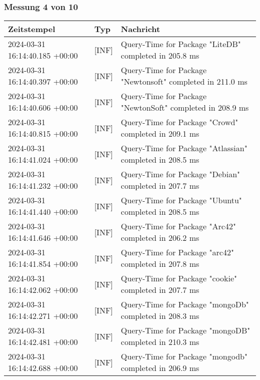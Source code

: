     \subsubsection*{Messung 4 von 10} \label{subsubsec:MySQLOhneIndex4von10}
        {
            {\small
                \begin{tabularx}{\textwidth}{|l|l|X|}
                    \hline
                    \textbf{Zeitstempel} & \textbf{Typ} & \textbf{Nachricht} \\
                    \hline
                    \endhead
                    2024-03-31 16:14:40.185 +00:00 & [INF] & Query-Time for Package "LiteDB" completed in 205.8 ms \\
                    2024-03-31 16:14:40.397 +00:00 & [INF] & Query-Time for Package "Newtonsoft" completed in 211.0 ms \\
                    2024-03-31 16:14:40.606 +00:00 & [INF] & Query-Time for Package "NewtonSoft" completed in 208.9 ms \\
                    2024-03-31 16:14:40.815 +00:00 & [INF] & Query-Time for Package "Crowd" completed in 209.1 ms \\
                    2024-03-31 16:14:41.024 +00:00 & [INF] & Query-Time for Package "Atlassian" completed in 208.5 ms \\
                    2024-03-31 16:14:41.232 +00:00 & [INF] & Query-Time for Package "Debian" completed in 207.7 ms \\
                    2024-03-31 16:14:41.440 +00:00 & [INF] & Query-Time for Package "Ubuntu" completed in 208.5 ms \\
                    2024-03-31 16:14:41.646 +00:00 & [INF] & Query-Time for Package "Arc42" completed in 206.2 ms \\
                    2024-03-31 16:14:41.854 +00:00 & [INF] & Query-Time for Package "arc42" completed in 207.8 ms \\
                    2024-03-31 16:14:42.062 +00:00 & [INF] & Query-Time for Package "cookie" completed in 207.7 ms \\
                    2024-03-31 16:14:42.271 +00:00 & [INF] & Query-Time for Package "mongoDb" completed in 208.3 ms \\
                    2024-03-31 16:14:42.481 +00:00 & [INF] & Query-Time for Package "mongoDB" completed in 210.3 ms \\
                    2024-03-31 16:14:42.688 +00:00 & [INF] & Query-Time for Package "mongodb" completed in 206.9 ms \\

\end{tabularx}}}
